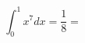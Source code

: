 \begin{texcode}[breaklines=true,basicstyle=\scriptsize\ttfamily]
        \[
        \int_0^1 x^7 dx = 
        \frac{1}{8} = 
        \]
\end{texcode}
